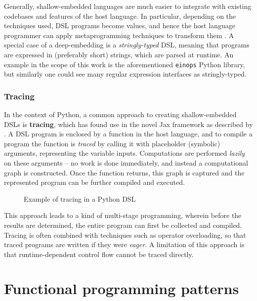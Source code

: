 Generally, shallow-embedded languages are much easier to integrate with existing codebases and features of the host language. In particular, depending on the techniques used, DSL programs become values, and hence the host language programmer can apply metaprogramming techniques to transform them \cite{atkey2009unembedding}. 
A special case of a deep-embedding is a \textit{stringly-typed} DSL, meaning that programs are expressed in (preferably short) strings, which are parsed at runtime. An example in the scope of this work is the aforementioned \texttt{einops} Python library, but similarly one could see many regular expression interfaces as stringly-typed.

\subsubsection{Tracing} \label{tracing}

In the context of Python, a common approach to creating shallow-embedded DSLs is \textbf{tracing}, which has found use in the novel Jax framework as described by \textcite{frostig2018compiling}. A DSL program is enclosed by a function in the host language, and to compile a program the function is \textit{traced} by calling it with placeholder (symbolic) arguments, representing the variable inputs. Computations are performed \textit{lazily} on these arguments -- no work is done immediately, and instead a computational graph is constructed. Once the function returns, this graph is captured and the represented program can be further compiled and executed.

\begin{figure}[ht]
    \caption{Example of tracing in a Python DSL}
    \label{fig:tracing}
\end{figure}

This approach leads to a kind of multi-stage programming, wherein before the results are determined, the entire program can first be collected and compiled. Tracing is often combined with techniques such as operator overloading, so that traced programs are written if they were \textit{eager}. A limitation of this approach is that runtime-dependent control flow cannot be traced directly.

\section{Functional programming patterns}

